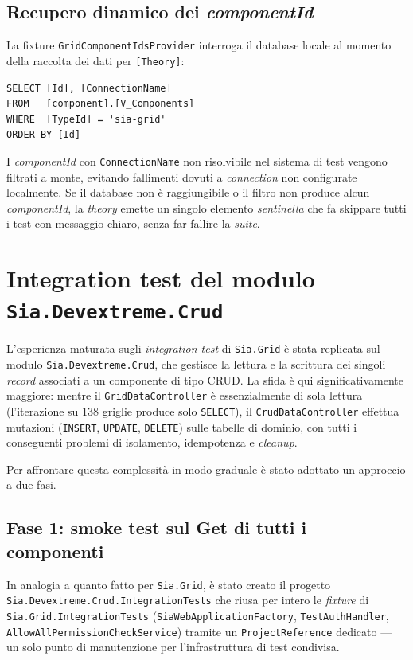 \subsection{Recupero dinamico dei \emph{componentId}}

La fixture \texttt{GridComponentIdsProvider} interroga il database locale al momento della raccolta dei dati per \texttt{[Theory]}:

\begin{verbatim}
SELECT [Id], [ConnectionName]
FROM   [component].[V_Components]
WHERE  [TypeId] = 'sia-grid'
ORDER BY [Id]
\end{verbatim}

I \emph{componentId} con \texttt{ConnectionName} non risolvibile nel sistema di test vengono filtrati a monte, evitando fallimenti dovuti a \emph{connection} non configurate localmente. Se il database non è raggiungibile o il filtro non produce alcun \emph{componentId}, la \emph{theory} emette un singolo elemento \emph{sentinella} che fa skippare tutti i test con messaggio chiaro, senza far fallire la \emph{suite}.

\section{Integration test del modulo \texttt{Sia.Devextreme.Crud}}

L'esperienza maturata sugli \emph{integration test} di \texttt{Sia.Grid} è stata replicata sul modulo \texttt{Sia.Devextreme.Crud}, che gestisce la lettura e la scrittura dei singoli \emph{record} associati a un componente di tipo CRUD. La sfida è qui significativamente maggiore: mentre il \texttt{GridDataController} è essenzialmente di sola lettura (l'iterazione su $138$ griglie produce solo \texttt{SELECT}), il \texttt{CrudDataController} effettua mutazioni (\texttt{INSERT}, \texttt{UPDATE}, \texttt{DELETE}) sulle tabelle di dominio, con tutti i conseguenti problemi di isolamento, idempotenza e \emph{cleanup}.

Per affrontare questa complessità in modo graduale è stato adottato un approccio a due fasi.

\subsection{Fase 1: smoke test sul Get di tutti i componenti}

In analogia a quanto fatto per \texttt{Sia.Grid}, è stato creato il progetto \texttt{Sia.Devextreme.Crud.IntegrationTests} che riusa per intero le \emph{fixture} di \texttt{Sia.Grid.IntegrationTests} (\texttt{SiaWebApplicationFactory}, \texttt{TestAuthHandler}, \texttt{AllowAllPermissionCheckService}) tramite un \texttt{ProjectReference} dedicato — un solo punto di manutenzione per l'infrastruttura di test condivisa.

